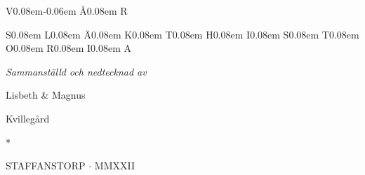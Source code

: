 
\def\capspace{\kern0.08em\relax}



{\typosize[24/]\currvar%
\centerline{%
V\capspace\kern-0.06em%
Å\capspace%
R}
\vskip10pt
\centerline{%
S\capspace%
L\capspace%
Ä\capspace%
K\capspace%
T\capspace%
H\capspace%
I\capspace%
S\capspace%
T\capspace%
O\capspace%
R\capspace%
I\capspace%
A}
}
\vskip26pt
\centerline{\typosize[15/]\it Sammanställd och nedtecknad av}
\vskip24pt
\centerline{\typosize[18/] Lisbeth \& Magnus}
\vskip10pt
\centerline{\typosize[18/] Kvillegård}
\vskip30pt
\centerline{*}

\vskip150pt
\centerline{\typosize[11/]STAFFANSTORP $\cdot$ MMXXII}

\vfil\break
